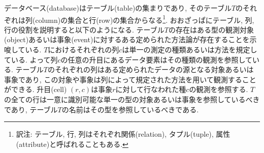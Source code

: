 データベース(database)はテーブル(table)の集まりであり, そのテーブル$T$のそれぞれは列(column)の集合と行(row)の集合からなる\footnote{訳注: テーブル, 行, 列はそれぞれ関係(relation), タプル(tuple), 属性(attribute)と呼ばれることもある.}. おおざっぱにテーブル, 列, 行の役割を説明すると以下のようになる. テーブル$T$の存在はある型の観測対象(object)あるいは事象(event)に対するある定められた方法論が存在することを示唆している. $T$におけるそれぞれの列$c$は単一の測定の種類あるいは方法を規定している. よって列$c$の任意の升目にあるデータ要素はその種類の観測を参照している. テーブル$T$のそれぞれの列はある定められたデータの源となる対象あるいは事象であり, この対象や事象は列によって規定された方法を用いて観測することができる. 升目(cell) $(r,c)$は事象$r$に対して行なわれた種$c$の観測を参照する. $T$の全ての行は一意に識別可能な単一の型の対象あるいは事象を参照しているべきであり, テーブル$T$の名前はその型を参照しているべきである. 

